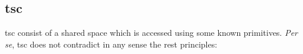 


\subsection{\acl{tsc}}
\label{sec:tsc_vs_rest}

\ac{tsc} consist of a shared space which is accessed using some known primitives.
\emph{Per se}, \ac{tsc} does not contradict in any sense the \ac{rest} principles:

